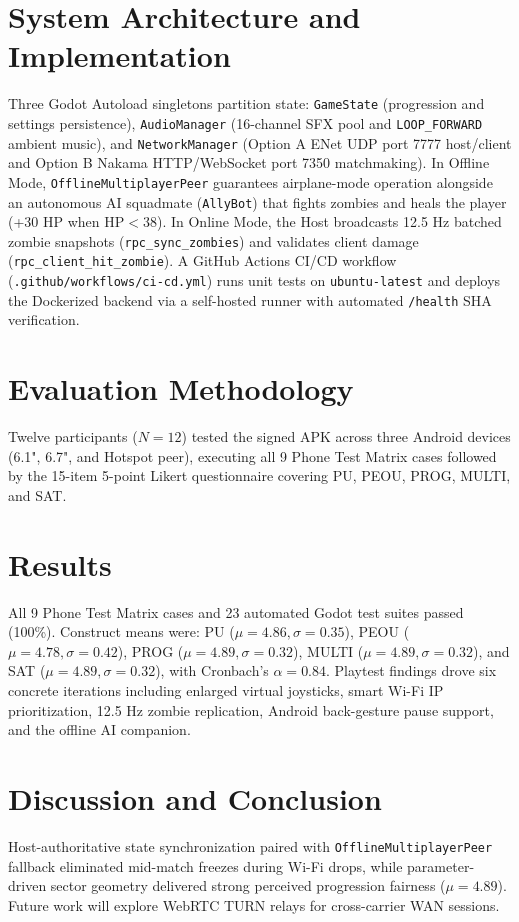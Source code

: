 \documentclass[conference]{IEEEtran}
\begin{document}
\section{System Architecture and Implementation}
Three Godot Autoload singletons partition state: \texttt{GameState} (progression and settings persistence), \texttt{AudioManager} (16-channel SFX pool and \texttt{LOOP\_FORWARD} ambient music), and \texttt{NetworkManager} (Option A ENet UDP port 7777 host/client and Option B Nakama HTTP/WebSocket port 7350 matchmaking). In Offline Mode, \texttt{OfflineMultiplayerPeer} guarantees airplane-mode operation alongside an autonomous AI squadmate (\texttt{AllyBot}) that fights zombies and heals the player (+30 HP when $\text{HP} < 38$). In Online Mode, the Host broadcasts 12.5 Hz batched zombie snapshots (\texttt{rpc\_sync\_zombies}) and validates client damage (\texttt{rpc\_client\_hit\_zombie}). A GitHub Actions CI/CD workflow (\texttt{.github/workflows/ci-cd.yml}) runs unit tests on \texttt{ubuntu-latest} and deploys the Dockerized backend via a self-hosted runner with automated \texttt{/health} SHA verification.

\section{Evaluation Methodology}
Twelve participants ($N=12$) tested the signed APK across three Android devices (6.1", 6.7", and Hotspot peer), executing all 9 Phone Test Matrix cases followed by the 15-item 5-point Likert questionnaire covering PU, PEOU, PROG, MULTI, and SAT.

\section{Results}
All 9 Phone Test Matrix cases and 23 automated Godot test suites passed (100\%). Construct means were: PU ($\mu = 4.86, \sigma = 0.35$), PEOU ($\mu = 4.78, \sigma = 0.42$), PROG ($\mu = 4.89, \sigma = 0.32$), MULTI ($\mu = 4.89, \sigma = 0.32$), and SAT ($\mu = 4.89, \sigma = 0.32$), with Cronbach's $\alpha = 0.84$. Playtest findings drove six concrete iterations including enlarged virtual joysticks, smart Wi-Fi IP prioritization, 12.5 Hz zombie replication, Android back-gesture pause support, and the offline AI companion.

\section{Discussion and Conclusion}
Host-authoritative state synchronization paired with \texttt{OfflineMultiplayerPeer} fallback eliminated mid-match freezes during Wi-Fi drops, while parameter-driven sector geometry delivered strong perceived progression fairness ($\mu = 4.89$). Future work will explore WebRTC TURN relays for cross-carrier WAN sessions.
\end{document}
